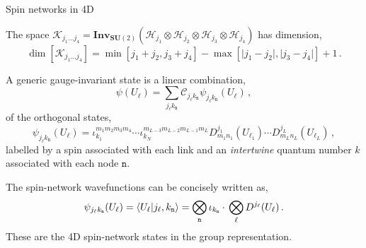 \documentclass[12pt,titlepage]{article}
\begin{document}
\begin{frame}{Spin networks in 4D}
    \begin{list}{\,}{\leftmargin=1em \itemindent=0em}
        \item<1-> The space $\mathcal{K}_{j_1\dots j_4}=\mathbf{Inv}_{\mathbf{SU}(2)}(\mathcal{H}_{j_1}\otimes\mathcal{H}_{j_2}\otimes\mathcal{H}_{j_3}\otimes\mathcal{H}_{j_4})$ has dimension,
        \begin{equation}
            \operatorname{dim}[\mathcal{K}_{j_1\dots j_4}]=\operatorname{min}[j_1+j_2,j_3+j_4]-\operatorname{max}[\lvert j_1-j_2\rvert,\lvert j_3-j_4\rvert]+1\,.
        \end{equation}
        \item<2-> A generic gauge-invariant state is a linear combination,
        \begin{equation}
            \psi(U_\ell)=\sum_{j_\ell k_\mathtt{n}} \mathcal{C}_{j_\ell k_\mathtt{n}}\psi_{j_\ell k_\mathtt{n}}(U_\ell)\,,
        \end{equation}
        of the orthogonal states,
        \begin{equation}
            \psi_{j_\ell k_\mathtt{n}} (U_\ell)=\iota^{m_1m_2m_3m_4}_{k_1}\cdots\iota^{m_{L-3}m_{L-2}m_{L-1}m_L}_{k_N} D^{j_1}_{m_1n_1}(U_{\ell_1})\cdots D^{j_L}_{m_Ln_L}(U_{\ell_L})\,,
        \end{equation}
        labelled by a spin associated with each link and an \textit{intertwine} quantum number $k$ associated with each node $\mathtt{n}$.
        \item<3-> The spin-network wavefunctions can be concisely written as,
        \begin{equation}
            \psi_{j_\ell k_\mathtt{n}}(U_\ell)= \braket{U_\ell}{j_\ell,k_\mathtt{n}}=\bigotimes_\mathtt{n}\iota_{k_\mathtt{n}}\cdot\,\bigotimes_\ell D^{j_\ell}(U_\ell)\,.
        \end{equation}
        These are the 4D spin-network states in the group representation. 
    \end{list}
\end{frame}
\end{document}
